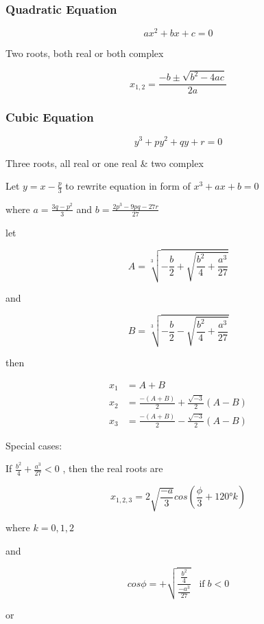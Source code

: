 \documentclass[
]{book}
\begin{document}
\hypertarget{quadratic-equation}{%
\subsubsection*{Quadratic Equation}\label{quadratic-equation}}

\[ax^2 + bx + c =0\]

Two roots, both real or both complex

\[x_{1,2} = \frac{-b \pm \sqrt{b^2 - 4ac}}{2a}\]

\hypertarget{cubic-equation}{%
\subsubsection*{Cubic Equation}\label{cubic-equation}}

\[y^3 + py^2 + qy + r = 0\]

Three roots, all real or one real \& two complex

Let \(y = x - \frac{p}{3}\) to rewrite equation in form of \(x^3 + ax + b = 0\)

where \(a = \frac{3q - p^2}{3}\) and \(b = \frac{2p^3 - 9pq - 27r}{27}\)

let

\[ A = \sqrt[3]{-\frac{b}{2} + \sqrt{\frac{b^2}{4} + \frac{a^3}{27}}}\]

and

\[B =\sqrt[3]{-\frac{b}{2} - \sqrt{\frac{b^2}{4} + \frac{a^3}{27}}} \]

then

\begin{align}
x_1 &= A + B\\
x_2 &= \frac{-(A + B)}{2} + \frac{\sqrt{-3}}{2} (A - B)\\
x_3 &= \frac{-(A + B)}{2} - \frac{\sqrt{-3}}{2} (A - B)
\end{align}

Special cases:

If \(\frac{b^2}{4} + \frac{a^3}{27} < 0\) , then the real roots are

\[x_{1,2,3} = 2 \sqrt{\frac{-a}{3}} cos \left( \frac{\phi}{3} + 120° k \right)\]

where \(k = 0,1,2\)

and

\[cos\phi = + \sqrt{\frac{ \frac{b^2}{4} }{ \frac{-a^3}{27} }} \;\;\;\text{if}\; b < 0\]

or
\end{document}
